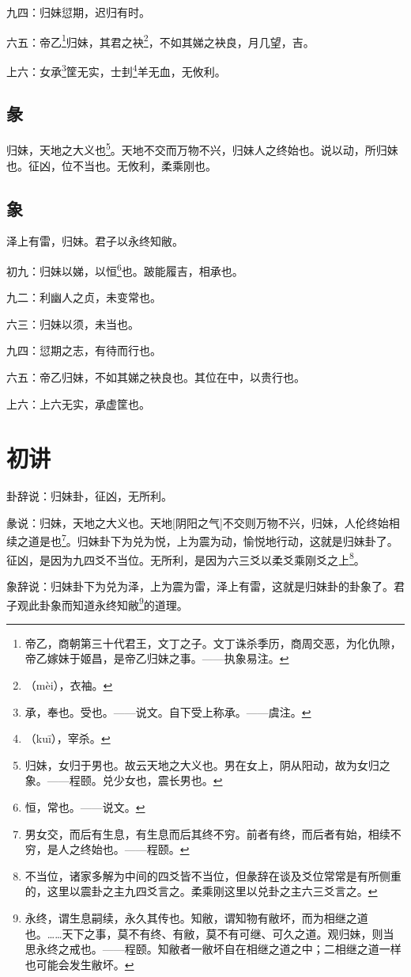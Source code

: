 \documentclass[12pt,oneside]{book}
\begin{document}
九四：归妹愆期，迟归有时。

六五：帝乙\footnote{帝乙，商朝第三十代君王，文丁之子。文丁诛杀季历，商周交恶，为化仇隙，帝乙嫁妹于姬昌，是帝乙归妹之事。——执象易注。}归妹，其君之袂\footnote{（mèi），衣袖。}，不如其娣之袂良，月几望，吉。

上六：女承\footnote{承，奉也。受也。——说文。自下受上称承。——虞注。}筐无实，士刲\footnote{（kuī），宰杀。}羊无血，无攸利。

\subsection{彖}
归妹，天地之大义也\footnote{归妹，女归于男也。故云天地之大义也。男在女上，阴从阳动，故为女归之象。——程颐。兑少女也，震长男也。}。天地不交而万物不兴，归妹人之终始也。说以动，所归妹也。征凶，位不当也。无攸利，柔乘刚也。

\subsection{象}
泽上有雷，归妹。君子以永终知敝。

初九：归妹以娣，以恒\footnote{恒，常也。——说文。}也。跛能履吉，相承也。

九二：利幽人之贞，未变常也。

六三：归妹以须，未当也。

九四：愆期之志，有待而行也。

六五：帝乙归妹，不如其娣之袂良也。其位在中，以贵行也。

上六：上六无实，承虚筐也。


\section{初讲}
卦辞说：归妹卦，征凶，无所利。

彖说：归妹，天地之大义也。天地[阴阳之气]不交则万物不兴，归妹，人伦终始相续之道是也\footnote{男女交，而后有生息，有生息而后其终不穷。前者有终，而后者有始，相续不穷，是人之终始也。——程颐。}。归妹卦下为兑为悦，上为震为动，愉悦地行动，这就是归妹卦了。征凶，是因为九四爻不当位。无所利，是因为六三爻以柔爻乘刚爻之上\footnote{不当位，诸家多解为中间的四爻皆不当位，但彖辞在谈及爻位常常是有所侧重的，这里以震卦之主九四爻言之。柔乘刚这里以兑卦之主六三爻言之。}。

象辞说：归妹卦下为兑为泽，上为震为雷，泽上有雷，这就是归妹卦的卦象了。君子观此卦象而知道永终知敝\footnote{永终，谓生息嗣续，永久其传也。知敝，谓知物有敝坏，而为相继之道也。……天下之事，莫不有终、有敝，莫不有可继、可久之道。观归妹，则当思永终之戒也。——程颐。知敝者一敝坏自在相继之道之中；二相继之道一样也可能会发生敝坏。}的道理。
\end{document}
